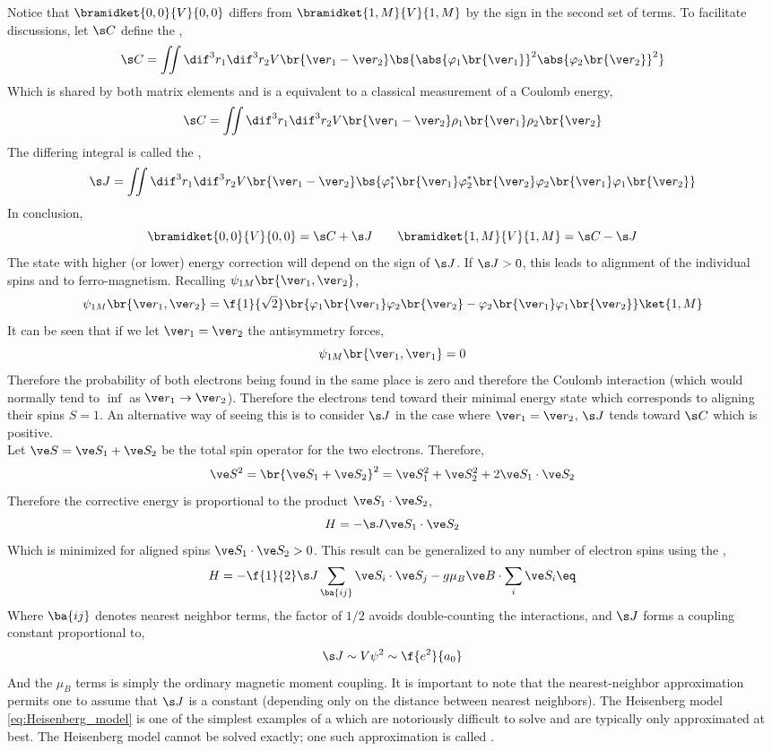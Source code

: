 \documentclass{article}
\newcommand{\vp}{\varphi}
\begin{document}
Notice that $\bramidket{0,0}{V}{0,0}$ differs from $\bramidket{1,M}{V}{1,M}$ by the sign in the second set of terms. To facilitate discussions, let $\s C$ define the ,
\[ \s C = \iint \dif^3 r_1 \dif^3 r_2 V\br{\ve r_1 - \ve r_2} \bs{\abs{\vp_1\br{\ve r_1}}^2 \abs{\vp_2\br{\ve r_2}}^2} \]
Which is shared by both matrix elements and is a equivalent to a classical measurement of a Coulomb energy,
\[ \s C = \iint \dif^3 r_1 \dif^3 r_2 V\br{\ve r_1 - \ve r_2} \rho_1\br{\ve r_1}\rho_2\br{\ve r_2} \]
The differing integral is called the ,
\[ \s J = \iint \dif^3 r_1 \dif^3 r_2 V\br{\ve r_1 - \ve r_2} \bs{\vp_1^{*}\br{\ve r_1} \vp_2^{*}\br{\ve r_2}\vp_2\br{\ve r_1} \vp_1\br{\ve r_2}} \]
In conclusion,
\[ \bramidket{0,0}{V}{0,0} = \s C + \s J \qquad \bramidket{1,M}{V}{1,M} = \s C - \s J \]
The state with higher (or lower) energy correction will depend on the sign of $\s J$. If $\s J > 0$, this leads to alignment of the individual spins and to ferro-magnetism. Recalling $\psi_{1M} \br{\ve r_1, \ve r_2}$,
\[ \psi_{1M} \br{\ve r_1, \ve r_2} = \f{1}{\sqrt{2}}\br{\vp_1\br{\ve r_1} \vp_2\br{\ve r_2} - \vp_2\br{\ve r_1} \vp_1\br{\ve r_2}} \ket{1, M} \]
It can be seen that if we let $\ve r_1 = \ve r_2$ the antisymmetry forces,
\[ \psi_{1M} \br{\ve r_1, \ve r_1} = 0 \]
Therefore the probability of both electrons being found in the same place is zero and therefore the Coulomb interaction (which would normally tend to $\inf$ as $\ve r_1 \to \ve r_2$). Therefore the electrons tend toward their minimal energy state which corresponds to aligning their spins $S = 1$. An alternative way of seeing this is to consider $\s J$ in the case where $\ve r_1 = \ve r_2$, $\s J$ tends toward $\s C$ which is positive.\\

Let $\ve S = \ve S_1 + \ve S_2$ be the total spin operator for the two electrons. Therefore,
\[ \ve S^2 = \br{\ve S_1 + \ve S_2}^2 = \ve S_1^2 + \ve S_2^2 + 2 \ve S_1 \cdot \ve S_2 \]
Therefore the corrective energy is proportional to the product $\ve S_1 \cdot \ve S_2$,
\[ H = - \s J \ve S_1 \cdot \ve S_2 \]
Which is minimized for aligned spins $\ve S_1 \cdot \ve S_2 > 0$. This result can be generalized to any number of electron spins using the ,
\[ H = -\f{1}{2} \s J \sum_{\ba{ij}} {\ve S_i \cdot \ve S_j} - g \mu_{B} \ve B \cdot \sum_{i} \ve S_i \eq \label{eq:Heisenberg_model}\]
Where $\ba{ij}$ denotes nearest neighbor terms, the factor of $1/2$ avoids double-counting the interactions, and $\s J$ forms a coupling constant proportional to,
\[ \s J \sim V \psi^2 \sim \f{e^2}{a_0} \]
And the $\mu_{B}$ terms is simply the ordinary magnetic moment coupling. It is important to note that the nearest-neighbor approximation permits one to assume that $\s J$ is a constant (depending only on the distance between nearest neighbors). The Heisenberg model \cref{eq:Heisenberg_model} is one of the simplest examples of a  which are notoriously difficult to solve and are typically only approximated at best. The Heisenberg model cannot be solved exactly; one such approximation is called .
\end{document}
